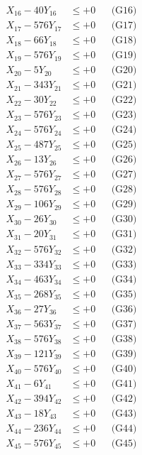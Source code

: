 \documentclass[a4paper,10pt]{article}
\begin{document}
{\begin{align}
X_{16} - 40Y_{16} &\leq +0 && \text{(G16)} \\
X_{17} - 576Y_{17} &\leq +0 && \text{(G17)} \\
X_{18} - 66Y_{18} &\leq +0 && \text{(G18)} \\
X_{19} - 576Y_{19} &\leq +0 && \text{(G19)} \\
X_{20} - 5Y_{20} &\leq +0 && \text{(G20)} \\
\allowbreak
X_{21} - 343Y_{21} &\leq +0 && \text{(G21)} \\
X_{22} - 30Y_{22} &\leq +0 && \text{(G22)} \\
X_{23} - 576Y_{23} &\leq +0 && \text{(G23)} \\
X_{24} - 576Y_{24} &\leq +0 && \text{(G24)} \\
X_{25} - 487Y_{25} &\leq +0 && \text{(G25)} \\
X_{26} - 13Y_{26} &\leq +0 && \text{(G26)} \\
X_{27} - 576Y_{27} &\leq +0 && \text{(G27)} \\
X_{28} - 576Y_{28} &\leq +0 && \text{(G28)} \\
X_{29} - 106Y_{29} &\leq +0 && \text{(G29)} \\
X_{30} - 26Y_{30} &\leq +0 && \text{(G30)} \\
\allowbreak
X_{31} - 20Y_{31} &\leq +0 && \text{(G31)} \\
X_{32} - 576Y_{32} &\leq +0 && \text{(G32)} \\
X_{33} - 334Y_{33} &\leq +0 && \text{(G33)} \\
X_{34} - 463Y_{34} &\leq +0 && \text{(G34)} \\
X_{35} - 268Y_{35} &\leq +0 && \text{(G35)} \\
X_{36} - 27Y_{36} &\leq +0 && \text{(G36)} \\
X_{37} - 563Y_{37} &\leq +0 && \text{(G37)} \\
X_{38} - 576Y_{38} &\leq +0 && \text{(G38)} \\
X_{39} - 121Y_{39} &\leq +0 && \text{(G39)} \\
X_{40} - 576Y_{40} &\leq +0 && \text{(G40)} \\
\allowbreak
X_{41} - 6Y_{41} &\leq +0 && \text{(G41)} \\
X_{42} - 394Y_{42} &\leq +0 && \text{(G42)} \\
X_{43} - 18Y_{43} &\leq +0 && \text{(G43)} \\
X_{44} - 236Y_{44} &\leq +0 && \text{(G44)} \\
X_{45} - 576Y_{45} &\leq +0 && \text{(G45)} \\

\end{align}}
\end{document}
